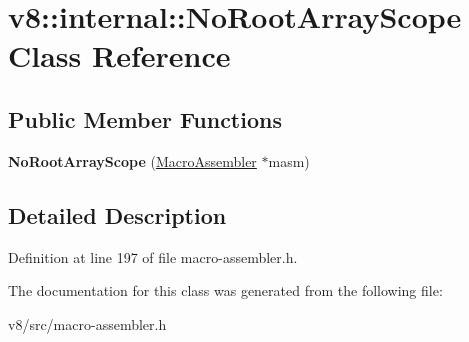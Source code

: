 \hypertarget{classv8_1_1internal_1_1NoRootArrayScope}{}\section{v8\+:\+:internal\+:\+:No\+Root\+Array\+Scope Class Reference}
\label{classv8_1_1internal_1_1NoRootArrayScope}
\subsection*{Public Member Functions}
\begin{DoxyCompactItemize}
\item 
\mbox{\label{classv8_1_1internal_1_1NoRootArrayScope_a38a0557626edab1f7544dc49147c9631}} 
{\bfseries No\+Root\+Array\+Scope} (\mbox{\hyperlink{classv8_1_1internal_1_1MacroAssembler}{Macro\+Assembler}} $\ast$masm)
\end{DoxyCompactItemize}


\subsection{Detailed Description}


Definition at line 197 of file macro-\/assembler.\+h.



The documentation for this class was generated from the following file\+:\begin{DoxyCompactItemize}
\item 
v8/src/macro-\/assembler.\+h\end{DoxyCompactItemize}
